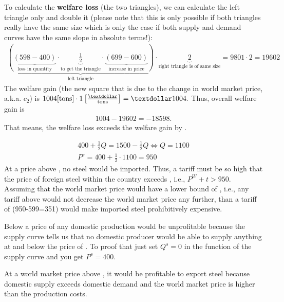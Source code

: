 {{	To calculate the \textbf{welfare loss} (the two triangles), we can calculate the left triangle only and double it (please note that this is only possible if both triangles really have the same size which is only the case if both supply and demand curves have the same slope in absolute terms!):
		\begin{align*}
			\underbrace{\left(\underbrace{(598-400)}_{\text{loss in quantity}}\cdot \underbrace{\frac{1}{2}}_{\text{to get the triangle}}\cdot \underbrace{(699-600)}_{\text{increase in price}}\right)}_{\text{left triangle}}\cdot \underbrace{2}_{\text{right triangle is of same size}}=9801\cdot 2=19602
		\end{align*}
	The welfare gain (the new square that is due to the change in world market price, a.k.a. $c_2$) is $1004 [\text{tons}] \cdot  1 \left[\frac{\textdollar}{\text{tons}}\right]=\textdollar 1004.$
		Thus, overall welfare gain is 
		\begin{align*}
			1004-19602=-18598.
		\end{align*}
		That means, the welfare loss exceeds the welfare gain by .
		\item \begin{align*}
			400+\frac{1}{2}Q=1500-\frac{1}{2}Q \Leftrightarrow Q=1100\\
			P^s=400+\frac{1}{2}\cdot 1100=950
		\end{align*}
		At a price above , no steel would be imported. Thus, a tariff must be so high that the price of foreign steel within the country exceeds , i.e., $P^W+t>950$. Assuming that the world market price would have a lower bound of , i.e., any tariff above  would not decrease the world market price any further, than a tariff of (950-599=351)  would make imported steel prohibitively expensive.
		\item Below a price of  any domestic production would be unprofitable because the supply curve tells us that no domestic producer would be able to supply anything at and below the price of . To proof that just set $Q^s=0$ in the function of the supply curve and you get $P^s=400$.
		\item At a world market price above , it would be profitable to export steel because domestic supply exceeds domestic demand and the world market price is higher than the production costs.
	}
}


